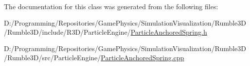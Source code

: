 The documentation for this class was generated from the following files\+:\begin{DoxyCompactItemize}
\item 
D\+:/\+Programming/\+Repositories/\+Game\+Physics/\+Simulation\+Visualization/\+Rumble3\+D/\+Rumble3\+D/include/\+R3\+D/\+Particle\+Engine/\mbox{\hyperlink{_particle_anchored_spring_8h}{Particle\+Anchored\+Spring.\+h}}\item 
D\+:/\+Programming/\+Repositories/\+Game\+Physics/\+Simulation\+Visualization/\+Rumble3\+D/\+Rumble3\+D/src/\+Particle\+Engine/\mbox{\hyperlink{_particle_anchored_spring_8cpp}{Particle\+Anchored\+Spring.\+cpp}}\end{DoxyCompactItemize}
